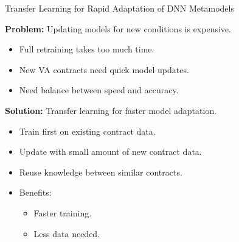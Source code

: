 \documentclass[9pt,handout]{beamer}
\begin{document}
\begin{frame}{Transfer Learning for Rapid Adaptation of DNN Metamodels}

    \textbf{Problem:} Updating models for new conditions is expensive.
    \begin{itemize}
        \item   Full retraining takes too much time.
        \item   New VA contracts need quick model updates.
        \item   Need balance between speed and accuracy.
    \end{itemize}

    \vspace{10pt}

    \textbf{Solution:} Transfer learning for faster model adaptation.

    \begin{itemize}
        \item   Train first on existing contract data.
        \item   Update with small amount of new contract data.
        \item   Reuse knowledge between similar contracts.
        \item   Benefits:
            \begin{itemize}
                \item   Faster training.
                \item   Less data needed.
            \end{itemize}
    \end{itemize}


\end{frame}
\end{document}
